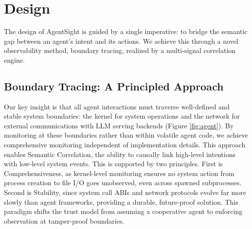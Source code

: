 % 
\section{Design}

The design of AgentSight is guided by a single imperative: to bridge the semantic gap between an agent's intent and its actions. We achieve this through a novel observability method, boundary tracing, realized by a multi-signal correlation engine.

\subsection{Boundary Tracing: A Principled Approach}

Our key insight is that all agent interactions must traverse well-defined and stable system boundaries: the kernel for system operations and the network for external communications with LLM serving backends (Figure \ref{fig:agent}). By monitoring at these boundaries rather than within volatile agent code, we achieve comprehensive monitoring independent of implementation details. This approach enables Semantic Correlation, the ability to causally link high-level intentions with low-level system events. This is supported by two principles. First is Comprehensiveness, as kernel-level monitoring ensures no system action from process creation to file I/O goes unobserved, even across spawned subprocesses. Second is Stability, since system call ABIs and network protocols evolve far more slowly than agent frameworks, providing a durable, future-proof solution. This paradigm shifts the trust model from assuming a cooperative agent to enforcing observation at tamper-proof boundaries.

